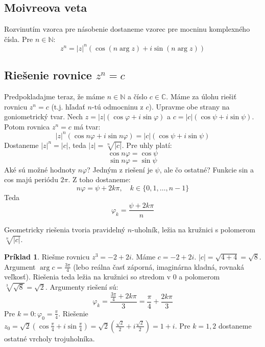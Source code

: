 \documentclass[11pt,a4paper]{article}
\theoremstyle{definition}
\newtheorem{priklad}[definicia]{Príklad}
\theoremstyle{plain}
\theoremstyle{remark}
\newcommand{\Nat}{\mathbb{N}}
\begin{document}
\subsection*{Moivreova veta}
Rozvinutím vzorca pre násobenie dostaneme vzorec pre mocninu komplexného čísla. Pre $n \in \Nat$:
$$ z^n = |z|^n (\cos(n \arg z) + i \sin(n \arg z)) $$

\subsection*{Riešenie rovnice $z^n = c$}
Predpokladajme teraz, že máme $n \in \Nat$ a číslo $c \in \mathbb{C}$. Máme za úlohu riešiť rovnicu $z^n = c$ (t.j. hľadať $n$-tú odmocninu z $c$).
Upravme obe strany na goniometrický tvar. Nech $z = |z|(\cos \varphi + i \sin \varphi)$ a $c = |c|(\cos \psi + i \sin \psi)$.
Potom rovnica $z^n = c$ má tvar:
$$ |z|^n (\cos n\varphi + i \sin n\varphi) = |c|(\cos \psi + i \sin \psi) $$
Dostaneme $|z|^n = |c|$, teda $|z| = \sqrt[n]{|c|}$.
Pre uhly platí:
$$ \cos n\varphi = \cos \psi $$
$$ \sin n\varphi = \sin \psi $$
Aké sú možné hodnoty $n\varphi$?
Jedným z riešení je $\psi$, ale čo ostatné? Funkcie sin a cos majú periódu $2\pi$. Z toho dostaneme:
$$ n\varphi = \psi + 2k\pi, \quad k \in \{0, 1, \dots, n-1\} $$
Teda
$$ \varphi_k = \frac{\psi + 2k\pi}{n} $$

Geometricky riešenia tvoria pravidelný $n$-uholník, ležia na kružnici s polomerom $\sqrt[n]{|c|}$.

\begin{priklad}
Riešme rovnicu $z^3 = -2 + 2i$.
Máme $c = -2+2i$. $|c| = \sqrt{4+4} = \sqrt{8}$.
Argument $\arg c = \frac{3\pi}{4}$ (lebo reálna časť záporná, imaginárna kladná, rovnaká veľkosť).
Riešenia teda ležia na kružnici so stredom v 0 a polomerom $\sqrt[3]{\sqrt{8}} = \sqrt{2}$.
Argumenty riešení sú:
$$ \varphi_k = \frac{\frac{3\pi}{4} + 2k\pi}{3} = \frac{\pi}{4} + \frac{2k\pi}{3} $$
Pre $k=0: \varphi_0 = \frac{\pi}{4}$. Riešenie $z_0 = \sqrt{2}(\cos \frac{\pi}{4} + i \sin \frac{\pi}{4}) = \sqrt{2}(\frac{\sqrt{2}}{2} + i\frac{\sqrt{2}}{2}) = 1+i$.
Pre $k=1, 2$ dostaneme ostatné vrcholy trojuholníka.
\end{priklad}
\end{document}
